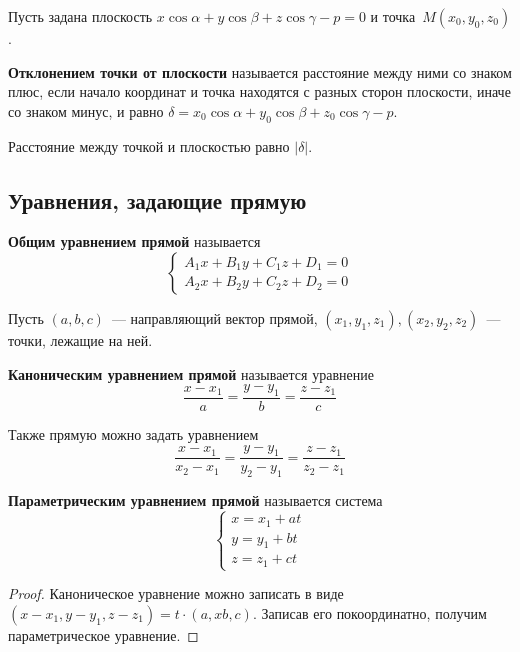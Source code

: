 Пусть задана плоскость $x \cos \alpha + y \cos \beta + z \cos \gamma - p = 0$ и точка~$M(x_0, y_0, z_0)$.

 \textbf{Отклонением точки от плоскости} называется расстояние между ними со знаком плюс, если начало координат и точка находятся с разных сторон плоскости, иначе со знаком минус, и равно $\delta = x_0 \cos \alpha + y_0 \cos \beta + z_0 \cos \gamma - p$.

Расстояние между точкой и плоскостью равно $|\delta|$.

\subsection{Уравнения, задающие прямую}
 \textbf{Общим уравнением прямой} называется
\begin{equation*}
\begin{cases}
A_1 x + B_1 y + C_1 z + D_1 = 0 \\
A_2 x + B_2 y + C_2 z + D_2 = 0
\end{cases}
\end{equation*}

Пусть $(a, b, c)$~--- направляющий вектор прямой, $(x_1, y_1, z_1), (x_2, y_2, z_2)$~--- точки, лежащие на ней.

\textbf{Каноническим уравнением прямой} называется уравнение
\begin{equation*}
\frac{x - x_1}a = \frac{y - y_1}b = \frac{z - z_1}c
\end{equation*}

Также прямую можно задать уравнением
\begin{equation*}
\frac{x - x_1}{x_2 - x_1} = \frac{y - y_1}{y_2 - y_1} = \frac{z - z_1}{z_2 - z_1}
\end{equation*}

\textbf{Параметрическим уравнением прямой} называется система
\begin{equation*}
\begin{cases}
x = x_1 + at \\
y = y_1 + bt \\
z = z_1 + ct
\end{cases}
\end{equation*}
\begin{proof}
Каноническое уравнение можно записать в виде $(x - x_1, y - y_1, z - z_1) = t \cdot (a,x b, c)$.
Записав его покоординатно, получим параметрическое уравнение.
\end{proof}